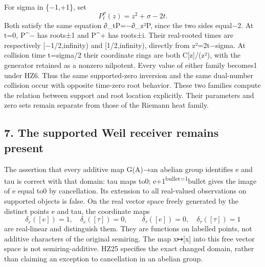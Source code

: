 \documentclass[
]{article}
\begin{document}
For sigma in \{−1,+1\}, set \[
P_t^\sigma(z)=z^2+\sigma-2t.
\tag{HZ24}
\] Both satisfy the same equation ∂\_tP=−∂\_z²P, since the two sides
equal−2. At t=0, P\^{}− has roots±1 and P\^{}+ has roots±i. Their
real-rooted times are respectively {[}−1/2,infinity) and
{[}1/2,infinity), directly from z²=2t−sigma. At collision time t=sigma/2
their coordinate rings are both C{[}z{]}/(z²), with the generator
retained as a nonzero nilpotent. Every value of either family becomes1
under HZ6. Thus the same supported-zero inversion and the same
dual-number collision occur with opposite time-zero root behavior. These
two families compute the relation between support and root location
explicitly. Their parameters and zero sets remain separate from those of
the Riemann heat family.

\subsection{7. The supported Weil receiver remains
present}\label{the-supported-weil-receiver-remains-present}

The assertion that every additive map G(A)→an abelian group identifies e
and tau is correct with that domain: tau maps to0;
e+1\textsuperscript{bullet=1}bullet gives the image of e equal to0 by
cancellation. Its extension to all real-valued observations on supported
objects is false. On the real vector space freely generated by the
distinct points e and tau, the coordinate maps \[
\delta_e([e])=1,\quad\delta_e([\tau])=0,
\qquad
\delta_\tau([e])=0,\quad\delta_\tau([\tau])=1
\tag{HZ25}
\] are real-linear and distinguish them. They are functions on labelled
points, not additive characters of the original semiring. The map
x↦{[}x{]} into this free vector space is not semiring-additive. HZ25
specifies the exact changed domain, rather than claiming an exception to
cancellation in an abelian group.
\end{document}

